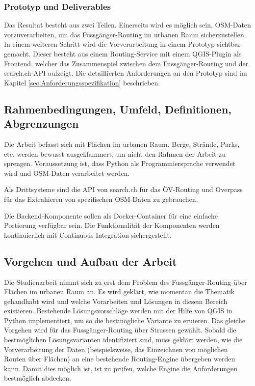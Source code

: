 \subsubsection{Prototyp und Deliverables}
\label{target:Prototyp und Deliverables}
Das Resultat besteht aus zwei Teilen. Einerseits wird es möglich sein, \ac{OSM}-Daten vorzuverarbeiten, um das Fussgänger-Routing im urbanen Raum sicherzustellen. In einem weiteren Schritt wird die Vorverarbeitung in einem Prototyp sichtbar gemacht. Dieser besteht aus einem Routing-Service mit einem QGIS-Plugin als Frontend, welcher das Zusammenspiel zwischen dem Fussgänger-Routing und der search.ch-\ac{API} aufzeigt. Die detaillierten Anforderungen an den Prototyp sind im Kapitel \ref{sec:Anforderungsspezifikation} beschrieben.
	
\subsection{Rahmenbedingungen, Umfeld, Definitionen, Abgrenzungen}
\label{Rahmenbedingungen, Umfeld, Definitionen, Abgrenzungen}
Die Arbeit befasst sich mit Flächen im urbanen Raum. Berge, Strände, Parks, etc. werden bewusst ausgeklammert, um nicht den Rahmen der Arbeit zu sprengen. Voraussetzung ist, dass Python als Programmiersprache verwendet wird und \ac{OSM}-Daten \cite{osm_data_switzerland} verarbeitet werden.

Als Drittsysteme sind die \ac{API} von search.ch \cite{search_ch_route_api} für das ÖV-Routing und Overpass \cite{wiki:overpass} für das Extrahieren von spezifischen \ac{OSM}-Daten zu gebrauchen.

Die Backend-Komponente sollen als Docker-Container für eine einfache Portierung verfügbar sein. Die Funktionalität der Komponenten werden kontinuierlich mit Continuous Integration sichergestellt.

\subsection{Vorgehen und Aufbau der Arbeit}
\label{Vorgehen und Aufbau der Arbeit}
Die Studienarbeit nimmt sich zu erst dem Problem des Fussgänger-Routing über Flächen im urbanen Raum an. Es wird geklärt, wie momentan die Thematik gehandhabt wird und welche Vorarbeiten und Lösungen in diesem Bereich existieren. Bestehende Lösungsvorschläge werden mit der Hilfe von QGIS in Python implementiert, um so die bestmögliche Variante zu eruieren. Das gleiche Vorgehen wird für das Fussgänger-Routing über Strassen gewählt. Sobald die bestmöglichen Lösungsvarianten identifiziert sind, muss geklärt werden, wie die Vorverarbeitung der Daten (beispielsweise, das Einzeichnen von möglichen Routen über Flächen) an eine bestehende Routing-Engine übergeben werden kann. Damit dies möglich ist, ist zu prüfen, welche Engine die Anforderungen bestmöglich abdecken.

